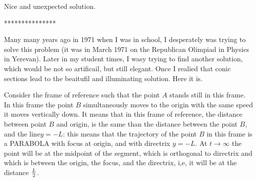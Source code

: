 Nice and unexpected solution.

***************


Many many years ago in 1971 when I was in school,
I desperately was trying to solve this problem
(it was in March 1971 on the Republican
Olimpiad in Physics in Yerevan).
Later in my student times,
I  wasy trying  to find another solution,
which would be  not so artificail, but
still elegant. Once I realied that
conic sections lead to the beaitufil and
illuminating solution. Here it is.
  
\m

  Consider the frame of reference such that 
the point $A$ stands still in this frame. 
In this frame the point
$B$ simultaneously moves to the origin with the
same speed it 
moves vertically down.
It means that in this frame of reference,
the distance between point $B$
and origin, is the same than the distance
between the point $B$, and the line$y=-L$: this means
that the trajectory of the point $B$ 
in this frame is a PARABOLA
with focus at origin, and with directrix $y=-L$.
At $t\to \infty$ the point will be at the midpoint
of the segment, which is orthogonal to directrix
and which is between the origin, the focus,
 and the directrix, i,e, it will be
at the distance  $L\over 2$.
\finish

\bye

